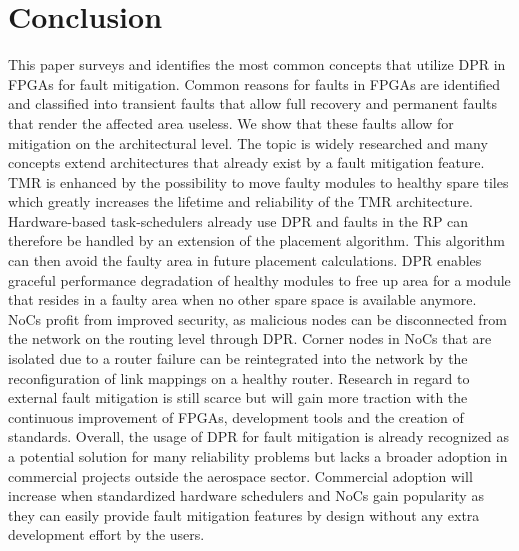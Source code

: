 \section{Conclusion}\label{Conclusion}
This paper surveys and identifies the most common concepts that utilize \gls{DPR} in \glspl{FPGA} for fault mitigation.
Common reasons for faults in \glspl{FPGA} are identified and classified into transient faults that allow full recovery and permanent faults that render the affected area useless. 
We show that these faults allow for mitigation on the architectural level.
The topic is widely researched and many concepts extend architectures that already exist by a fault mitigation feature.
\gls{TMR} is enhanced by the possibility to move faulty modules to healthy spare tiles which greatly increases the lifetime and reliability of the \gls{TMR} architecture.  
Hardware-based task-schedulers already use \gls{DPR} and faults in the \gls{RP} can therefore be handled by an extension of the placement algorithm.
This algorithm can then avoid the faulty area in future placement calculations.
\gls{DPR} enables graceful performance degradation of healthy modules to free up area for a module that resides in a faulty area when no other spare space is available anymore. 
\glspl{NoC} profit from improved security, as malicious nodes can be disconnected from the network on the routing level through \gls{DPR}.
Corner nodes in \glspl{NoC} that are isolated due to a router failure can be reintegrated into the network by the reconfiguration of link mappings on a healthy router. 
Research in regard to external fault mitigation is still scarce but will gain more traction with the continuous improvement of \glspl{FPGA}, development tools and the creation of standards.
Overall, the usage of \gls{DPR} for fault mitigation is already recognized as a potential solution for many reliability problems but lacks a broader adoption in commercial projects outside the aerospace sector.
Commercial adoption will increase when standardized hardware schedulers and \glspl{NoC} gain popularity as they can easily provide fault mitigation features by design without any extra development effort by the users.


